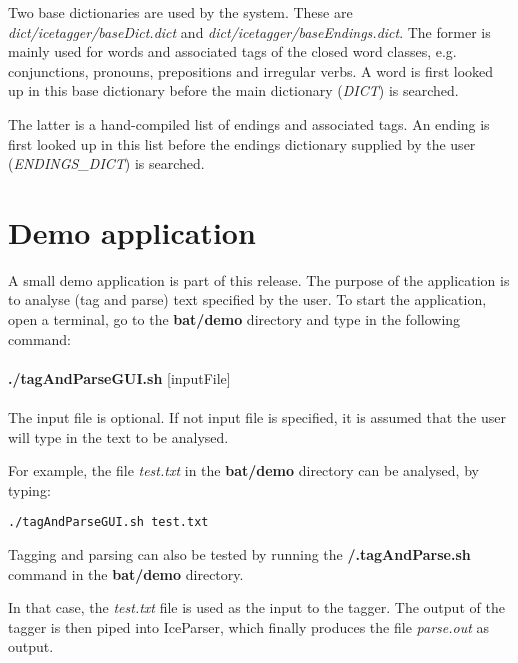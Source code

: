 \documentclass[11pt]{article}
\begin{document}
Two base dictionaries are used by the system.
These are \emph{dict/icetagger/baseDict.dict} and \emph{dict/icetagger/baseEndings.dict}.
The former is mainly used for words and associated tags of the closed word classes, e.g. conjunctions, pronouns, prepositions and irregular verbs.
A word is first looked up in this base dictionary before the main dictionary (\emph{DICT}) is searched.

The latter is a hand-compiled list of endings and associated tags.
An ending is first looked up in this list before the endings dictionary supplied by the user (\emph{ENDINGS\_DICT}) is searched.

\section{Demo application}
\label{sec:demo}
A small demo application is part of this release.
The purpose of the application is to analyse (tag and parse) text specified by the user.
To start the application, open a terminal, go to the \textbf{bat/demo} directory and type in the following command:\\ \\

{\bf ./tagAndParseGUI.sh} [inputFile]  \\ \\

The input file is optional.
If not input file is specified, it is assumed that the user will type in the text to be analysed.

For example, the file \emph{test.txt} in the \textbf{bat/demo} directory can be analysed, by typing:
\begin{verbatim}
./tagAndParseGUI.sh test.txt
\end{verbatim}

Tagging and parsing can also be tested by running the \textbf{/.tagAndParse.sh} command in the \textbf{bat/demo} directory.  

In that case, the \emph{test.txt} file is used as the input to the tagger.  The output of the tagger is then piped into IceParser, which finally produces the file \emph{parse.out} as output.


\newpage
\begin{spacing}{1.0}


\end{spacing}
\end{document}
